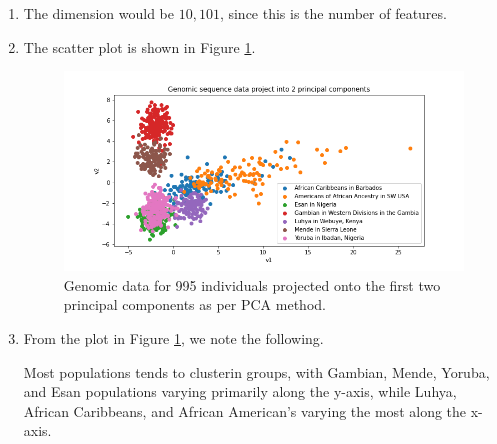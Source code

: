 \documentclass[12pt]{article}
\begin{document}
\begin{enumerate}[label=(\alph*)]
  \item
    The dimension would be $10,101$, since this is the number of features.
  \item
    The scatter plot is shown in Figure \ref{fig:pca_genomic_projection}.
    \begin{figure}[!ht]
      \centering
      \includegraphics[scale=0.5]{figures/genomic_2d_projection_use_mode=True.png}
      \caption{Genomic data for 995 individuals projected onto the first two principal components as per PCA method.}
      \label{fig:pca_genomic_projection}
    \end{figure}

  \item
    From the plot in Figure \ref{fig:pca_genomic_projection}, we note the following.

    Most populations tends to clusterin groups, with Gambian, Mende, Yoruba, and Esan populations varying primarily along the y-axis, while Luhya, African Caribbeans, and African American's varying the most along the x-axis.


\end{enumerate}
\end{document}
